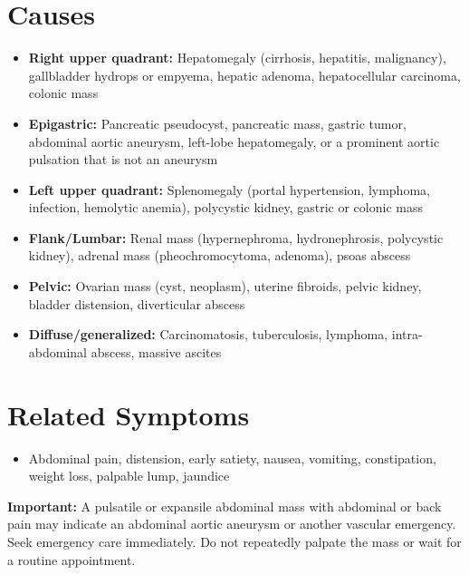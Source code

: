 \section*{Causes}
\begin{itemize}
 \item \textbf{Right upper quadrant:} Hepatomegaly (cirrhosis, hepatitis, malignancy), gallbladder hydrops or empyema, hepatic adenoma, hepatocellular carcinoma, colonic mass
 \item \textbf{Epigastric:} Pancreatic pseudocyst, pancreatic mass, gastric tumor, abdominal aortic aneurysm, left-lobe hepatomegaly, or a prominent aortic pulsation that is not an aneurysm
 \item \textbf{Left upper quadrant:} Splenomegaly (portal hypertension, lymphoma, infection, hemolytic anemia), polycystic kidney, gastric or colonic mass
 \item \textbf{Flank/Lumbar:} Renal mass (hypernephroma, hydronephrosis, polycystic kidney), adrenal mass (pheochromocytoma, adenoma), psoas abscess
 \item \textbf{Pelvic:} Ovarian mass (cyst, neoplasm), uterine fibroids, pelvic kidney, bladder distension, diverticular abscess
 \item \textbf{Diffuse/generalized:} Carcinomatosis, tuberculosis, lymphoma, intra-abdominal abscess, massive ascites
\end{itemize}

\section*{Related Symptoms}
\begin{itemize}
 \item Abdominal pain, distension, early satiety, nausea, vomiting, constipation, weight loss, palpable lump, jaundice
\end{itemize}
\textbf{Important:} A pulsatile or expansile abdominal mass with abdominal or back pain may indicate an abdominal aortic aneurysm or another vascular emergency. Seek emergency care immediately. Do not repeatedly palpate the mass or wait for a routine appointment.

